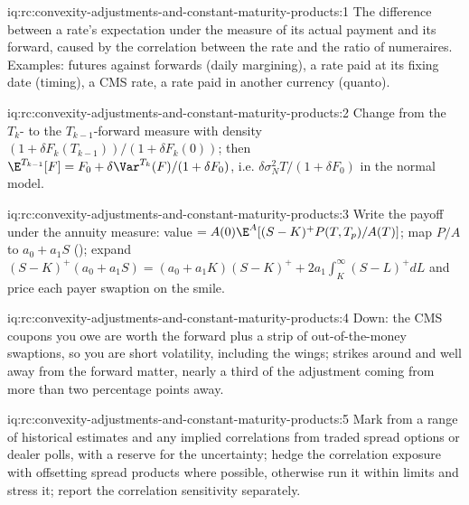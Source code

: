 \begin{solution}{iq:rc:convexity-adjustments-and-constant-maturity-products:1}
The difference between a rate's expectation under the measure of its actual
payment and its forward, caused by the correlation between the rate and the
ratio of numeraires. Examples: futures against forwards (daily margining),
a rate paid at its fixing date (timing), a CMS rate, a rate paid in another
currency (quanto).
\end{solution}

\begin{solution}{iq:rc:convexity-adjustments-and-constant-maturity-products:2}
Change from the $T_k$- to the $T_{k-1}$-forward measure with density
$(1+\delta F_k(T_{k-1}))/(1+\delta F_k(0))$; then $\E^{T_{k-1}}[F] =
F_0+\delta\Var^{T_k}(F)/(1+\delta F_0)$, i.e. $\delta\sigma_N^2T/(1+\delta F_0)$ in the
normal model.
\end{solution}

\begin{solution}{iq:rc:convexity-adjustments-and-constant-maturity-products:3}
Write the payoff under the annuity measure: value $=A(0)\E^A[(S-K)^+P(T,T_p)/A(T)]$;
map $P/A$ to $a_0+a_1S$ (); expand
$(S-K)^+(a_0+a_1S) = (a_0+a_1K)(S-K)^+ + 2a_1\int_K^\infty(S-L)^+dL$ and price each
payer swaption on the smile.
\end{solution}

\begin{solution}{iq:rc:convexity-adjustments-and-constant-maturity-products:4}
Down: the CMS coupons you owe are worth the forward plus a strip of
out-of-the-money swaptions, so you are short volatility, including the wings;
strikes around and well away from the forward matter, nearly a third of the
adjustment coming from more than two percentage points away.
\end{solution}

\begin{solution}{iq:rc:convexity-adjustments-and-constant-maturity-products:5}
Mark from a range of historical estimates and any implied correlations from
traded spread options or dealer polls, with a reserve for the uncertainty;
hedge the correlation exposure with offsetting spread products where
possible, otherwise run it within limits and stress it; report the correlation
sensitivity separately.
\end{solution}


